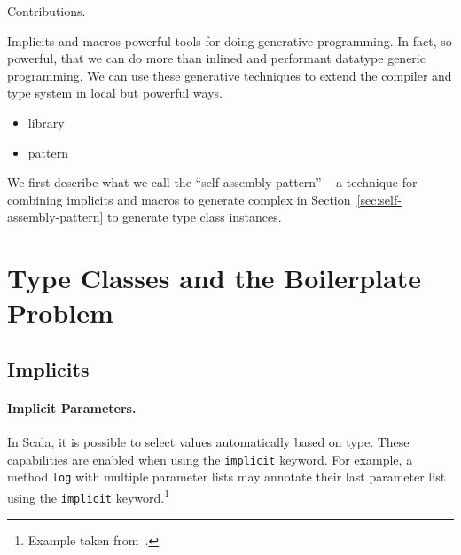 \documentclass[preprint]{sigplanconf}
\newcommand{\term}[1]{\mbox{\texttt{#1}}}
\begin{document}
Contributions.

Implicits and macros powerful tools for doing generative programming. In fact, so powerful, that we can do more than inlined and performant datatype generic programming. We can use these generative techniques to extend the compiler and type system in local but powerful ways.

\begin{itemize}
\item library
\item pattern
\end{itemize}

We first describe what we call the ``self-assembly pattern'' -- a technique for combining implicits and macros to generate complex in Section~\ref{sec:self-assembly-pattern} to generate type class instances.

\section{Type Classes and the Boilerplate Problem}
\label{sec:background}

\begin{comment}
\subsection{Singletons}
\label{sec:singletons}

...

\paragraph{Companion Objects} ...
\end{comment}

\subsection{Implicits}
\label{sec:implicits}

\paragraph{Implicit Parameters.} In Scala, it is possible to select values
automatically based on type. These capabilities are enabled when using the
\term{implicit} keyword. For example, a method \term{log} with multiple
parameter lists may annotate their last parameter list using the
\term{implicit} keyword.\footnote{Example taken from~\cite{Oliveira2010}.}
\end{document}
